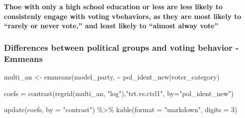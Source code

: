 \documentclass[
  letterpaper,
  DIV=11,
  numbers=noendperiod]{scrartcl}
\newenvironment{Shaded}{\begin{snugshade}}{\end{snugshade}}
\newcommand{\AttributeTok}[1]{\textcolor[rgb]{0.40,0.45,0.13}{#1}}
\newcommand{\DecValTok}[1]{\textcolor[rgb]{0.68,0.00,0.00}{#1}}
\newcommand{\FunctionTok}[1]{\textcolor[rgb]{0.28,0.35,0.67}{#1}}
\newcommand{\NormalTok}[1]{\textcolor[rgb]{0.00,0.23,0.31}{#1}}
\newcommand{\OtherTok}[1]{\textcolor[rgb]{0.00,0.23,0.31}{#1}}
\newcommand{\SpecialCharTok}[1]{\textcolor[rgb]{0.37,0.37,0.37}{#1}}
\newcommand{\StringTok}[1]{\textcolor[rgb]{0.13,0.47,0.30}{#1}}
\begin{document}
\textbf{Thoe with only a high school education or less are less likely
to consistenly engage with voting vbehaviors, as they are most likely to
``rarely or never vote,'' and least likely to ``almost alway vote''}

\subsubsection{Differences between political groups and voting behavior
-
Emmeans}\label{differences-between-political-groups-and-voting-behavior---emmeans}

\begin{Shaded}
\begin{Highlighting}[]
\NormalTok{multi\_an }\OtherTok{\textless{}{-}} \FunctionTok{emmeans}\NormalTok{(model\_party, }\SpecialCharTok{\textasciitilde{}}\NormalTok{ pol\_ident\_new}\SpecialCharTok{|}\NormalTok{voter\_category)}

\NormalTok{coefs }\OtherTok{=} \FunctionTok{contrast}\NormalTok{(}\FunctionTok{regrid}\NormalTok{(multi\_an, }\StringTok{"log"}\NormalTok{),}\StringTok{"trt.vs.ctrl1"}\NormalTok{,  }\AttributeTok{by=}\StringTok{"pol\_ident\_new"}\NormalTok{)}

\FunctionTok{update}\NormalTok{(coefs, }\AttributeTok{by =} \StringTok{"contrast"}\NormalTok{) }\SpecialCharTok{\%\textgreater{}\%} 
  \FunctionTok{kable}\NormalTok{(}\AttributeTok{format =} \StringTok{"markdown"}\NormalTok{, }\AttributeTok{digits =} \DecValTok{3}\NormalTok{)}
\end{Highlighting}
\end{Shaded}
\end{document}
